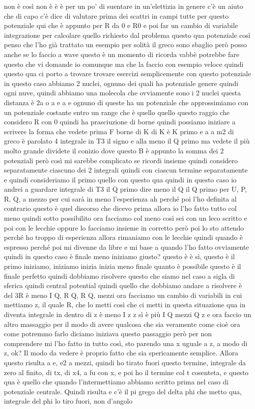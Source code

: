 \begin{soluzione}
{   non è così non è è è per un po' di suentare in un'elettizia in genere c'è un aiuto che di capo c'è dice di valutare prima dei scattri in campi tutte per questo potenziale qui che è appunto per R da 0 e R0 e poi far un cambio di variabile integrazione per calcolare quello richiesto dal problema questo qua potenziale così penso che l'ho già trattato un esempio per solità il greco sono sbaglio però posso anche se lo faccio a wave questo è un momento di ricorda vabbè potrebbe fare questo che vi domande io comunque ma che la faccio con esempio veloce quindi questo qua ci porto a trovare trovare esercizi semplicemente con questo potenziale in questo caso abbiamo 2 nuclei, ognuno dei quali ha potenziale genere quindi ogni nuve, quindi abbiamo una molecola che ovviamente sono i 2 nuclei questa distanza è 2a o a e a e ognuno di queste ha un potenziale che approssimiamo con un potenziale costante entro un range che è quello quello questo raggio che considero R con 0 quindi ha prasciuzione di borne quindi possiamo iniziare a scrivere la forma che vedete prima F borne di K di K è K primo e a a m2 di greco è parolato 4 integrale in T3 il signo e alla meno il Q primo ma vedete il più molto grande dividete il conizio dove questo B è appunto la somma dei 2 potenziali però così mi sarebbe complicato se ricordi insieme quindi considero separatamente ciascuno dei 2 integrali quindi con ciascun termine separatamente e quindi consideriamo il primo quello con questo qua quindi in questo caso io andrei a guardare integrale di T3 il Q primo dire meno il Q il Q primo per U, P, R, Q, a mezzo per cui sarà in meno l'esperienza ah perché poi l'ho definita al contrario questo è quel discorso che dicevo prima allora io l'ho fatto tutto col meno quindi sotto possibilito ora facciamo col meno così sei con un leco scritto e poi con le lecchie oppure lo facciamo insieme in corretto però poi lo sto attendo perché ho troppo di esperienza allora rimaniamo con le lecchie quindi quando è espresso perché poi mi divenne da libre e mi base a quando l'ho fatto ovviamente quindi in questo caso è finale meno iniziamo giusto? questo è è sì, questo è il primo iniziamo, iniziamo inizia inizia meno finale quanto è possibile questo è il finale perfetto quindi dobbiamo risolvere questo che siamo nel caso a sigla di sferica quindi central potential quindi quello che dobbiamo andare a risolvere è del 3R è meno I Q, R Q, R Q, mezzi ora facciamo un cambio di variabili in cui mettiamo z, il quale R, che lo metti così che ci metti in questa situazione qua in diventa integrale in dentro di z è meno I z z sì è più I Q mezzi Q z e ora faccio un altro massaggio per il modo di avere qualcosa che sia veramente come cioè ora come potremmo farlo diciamo iniziava questo passaggio però per non comprendere mi l'ho fatto in tutto così, sto parendo una x uguale a z, a modo di z, ok? Il modo da vedere è proprio fatto che sia spericamente semplice. Allora questo risulta a e, e2 a mezzi, quindi ho tirato fuori questo termine, integrale da zero al finito, di tx, di x4, a fu con x, e poi ho il termine col t cosenteta, e questo qua è quello che quando l'intermettiamo abbiamo scritto prima nel caso di potenziale centrale. Quindi risulta e c'è il pi grego del delta phi che metto qua, integrale del phi lo tiro fuori, non d'angolo }
\end{soluzione}
